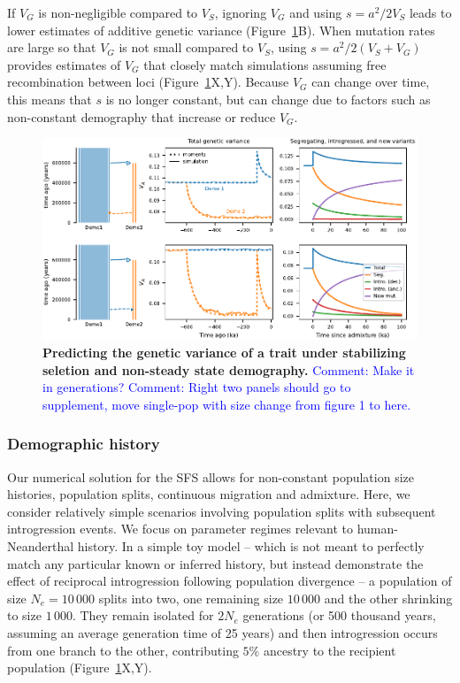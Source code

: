 \documentclass{article}
\newcommand{\aprcomment}[1]{{\textcolor{blue}{Comment: #1}}}
\begin{document}
If $V_G$ is non-negligible compared to $V_S$, ignoring $V_G$ and using
$s=a^2/2V_S$ leads to lower estimates of additive genetic variance
(Figure~\ref{fig:toy-admixture}B). When mutation rates are large so that $V_G$
is not small compared to $V_S$, using $s=a^2/2(V_S+V_G)$ provides estimates of
$V_G$ that closely match simulations assuming free recombination between loci
(Figure~\ref{fig:toy-admixture}X,Y). Because $V_G$ can change over time, this
means that $s$ is no longer constant, but can change due to factors such as
non-constant demography that increase or reduce $V_G$.

\begin{figure}[tb!]
    \centering
    \includegraphics{../figures/reciprocal_admixture.pdf}
    \caption{
        \textbf{Predicting the genetic variance of a trait under stabilizing
        seletion and non-steady state demography.}
        \aprcomment{Make it in generations?}
        \aprcomment{Right two panels should go to supplement, move single-pop
        with size change from figure 1 to here.}
    }
    \label{fig:toy-admixture}
\end{figure}

\subsubsection*{Demographic history}

Our numerical solution for the SFS allows for non-constant population size
histories, population splits, continuous migration and admixture. Here, we
consider relatively simple scenarios involving population splits with
subsequent introgression events. We focus on parameter regimes relevant to
human-Neanderthal history. In a simple toy model -- which is not meant to
perfectly match any particular known or inferred history, but instead
demonstrate the effect of reciprocal introgression following population
divergence -- a population of size $N_e=10\,000$ splits into two, one remaining
size $10\,000$ and the other shrinking to size $1\,000$. They remain isolated
for $2N_e$ generations (or 500 thousand years, assuming an average generation
time of 25 years) and then introgression occurs from one branch to the other,
contributing $5\%$ ancestry to the recipient population
(Figure~\ref{fig:toy-admixture}X,Y).
\end{document}
